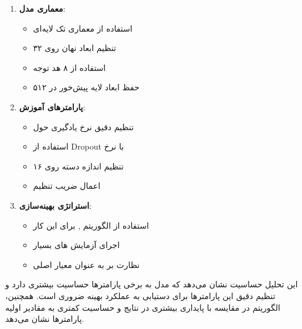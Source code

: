 \begin{enumerate}
    \renewcommand{\labelenumi}{\lr{$\bullet$}}
    \item \textbf{معماری مدل}:
    \begin{itemize}
        \renewcommand{\labelitemi}{\lr{$\bullet$}}
        \item استفاده از معماری تک لایه‌ای
        \item تنظیم ابعاد نهان روی ۳۲
        \item استفاده از ۸ هد توجه
        \item حفظ ابعاد لایه پیش‌خور در ۵۱۲
    \end{itemize}
    
    \item \textbf{پارامترهای آموزش}:
    \begin{itemize}
        \renewcommand{\labelitemi}{\lr{$\bullet$}}
        \item تنظیم دقیق نرخ یادگیری حول 
        \item استفاده از Dropout با نرخ 
        \item تنظیم اندازه دسته روی ۱۶
        \item اعمال ضریب تنظیم 
    \end{itemize}
    
    \item \textbf{استراتژی بهینه‌سازی}:
    \begin{itemize}
        \renewcommand{\labelitemi}{\lr{$\bullet$}}
        \item استفاده از الگوریتم  ,  برای این کار 
        \item اجرای آزمایش های بسیار
        \item نظارت بر  به عنوان معیار اصلی
    \end{itemize}
\end{enumerate}

این تحلیل حساسیت نشان می‌دهد که مدل  به برخی پارامترها حساسیت بیشتری دارد و تنظیم دقیق این پارامترها برای دستیابی به عملکرد بهینه ضروری است. همچنین، الگوریتم  در مقایسه با  پایداری بیشتری در نتایج و حساسیت کمتری به مقادیر اولیه پارامترها نشان می‌دهد.


